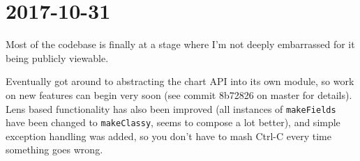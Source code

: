 \documentclass[a5paper,10pt]{article}
\begin{document}
    \section*{2017-10-31}
    
    Most of the codebase is finally at a stage where I'm not deeply embarrassed for it being publicly viewable.
    
    Eventually got around to abstracting the chart API into its own module, so work on new features can begin very soon (see commit 8b72826 on master for details). Lens based functionality has also been improved (all instances of \verb|makeFields| have been changed to \verb|makeClassy|, seems to compose a lot better), and simple exception handling was added, so you don't have to mash Ctrl-C every time something goes wrong.
\end{document}

